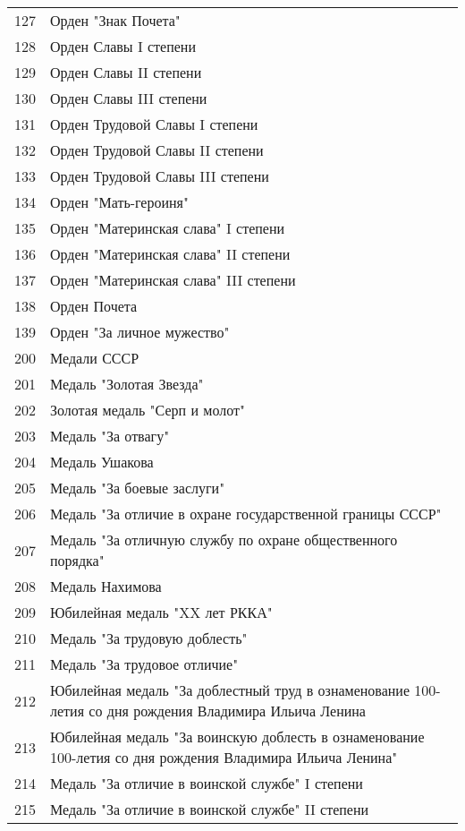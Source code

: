 \documentclass[10pt, a4paper, titlepage]{article}
\begin{document}
\begin{center}
\begin{longtable}{rp{}}
        127 & Орден "Знак Почета" \\
        128 & Орден Славы I степени \\
        129 & Орден Славы II степени \\
        130 & Орден Славы III степени \\
        131 & Орден Трудовой Славы I степени \\
        132 & Орден Трудовой Славы II степени \\
        133 & Орден Трудовой Славы III степени \\
        134 & Орден "Мать-героиня" \\
        135 & Орден "Материнская слава" I степени \\
        136 & Орден "Материнская слава" II степени \\
        137 & Орден "Материнская слава" III степени \\
        138 & Орден Почета \\
        139 & Орден "За личное мужество" \\
        200 & Медали СССР \\
        201 & Медаль "Золотая Звезда" \\
        202 & Золотая медаль "Серп и молот" \\
        203 & Медаль "За отвагу" \\
        204 & Медаль Ушакова \\
        205 & Медаль "За боевые заслуги" \\
        206 & Медаль "За отличие в охране государственной границы СССР" \\
        207 & Медаль "За отличную службу по охране общественного порядка" \\
        208 & Медаль Нахимова \\
        209 & Юбилейная медаль "XX лет РККА" \\
        210 & Медаль "За трудовую доблесть" \\
        211 & Медаль "За трудовое отличие" \\
        212 & Юбилейная медаль "За доблестный труд в ознаменование 100-летия со дня рождения Владимира Ильича Ленина \\
        213 & Юбилейная медаль "За воинскую доблесть в ознаменование 100-летия со дня рождения Владимира Ильича Ленина" \\
        214 & Медаль "За отличие в воинской службе" I степени \\
        215 & Медаль "За отличие в воинской службе" II степени \\

\end{longtable}
\end{center}
\end{document}
